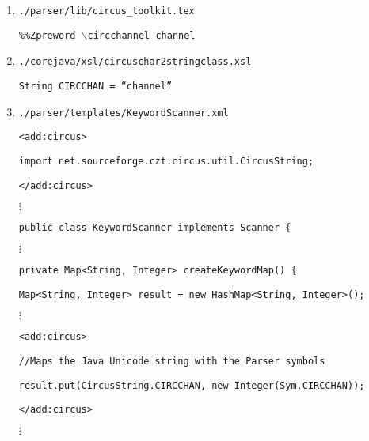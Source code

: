 \documentclass{article}
\begin{document}
\begin{enumerate}
    \item \texttt{./parser/lib/circus\_toolkit.tex}

      \hspace{5pt}\texttt{\%\%Zpreword $\backslash$circchannel channel}


    \item \texttt{./corejava/xsl/circuschar2stringclass.xsl}

      \hspace{5pt}\texttt{String CIRCCHAN = ``channel''}

    \item \texttt{./parser/templates/KeywordScanner.xml}

      \hspace{5pt}\texttt{<add:circus>}

      \hspace{5pt}\texttt{import net.sourceforge.czt.circus.util.CircusString;}

      \hspace{5pt}\texttt{</add:circus>}

      \hspace{5pt}$\vdots$

      \hspace{5pt}\texttt{public class KeywordScanner implements Scanner \{}

      \hspace{5pt}$\vdots$

        \hspace{15pt}\texttt{private Map<String, Integer> createKeywordMap() \{}

          \hspace{25pt}\texttt{Map<String, Integer> result = new HashMap<String, Integer>();}

          \hspace{25pt}$\vdots$

          \hspace{25pt}\texttt{<add:circus>}

          \hspace{25pt}\texttt{//Maps the Java Unicode string with the Parser symbols}

          \hspace{25pt}\texttt{result.put(CircusString.CIRCCHAN, new Integer(Sym.CIRCCHAN));}

          \hspace{25pt}\texttt{</add:circus>}

          \hspace{25pt}$\vdots$


\end{enumerate}
\end{document}
